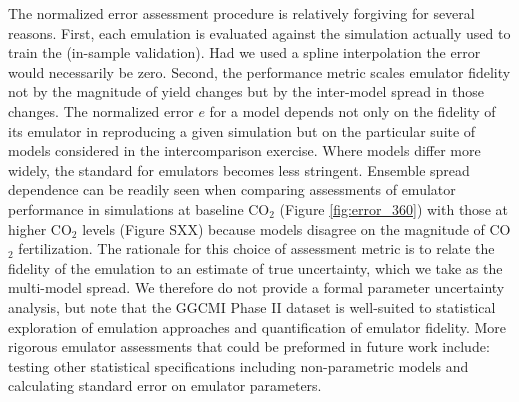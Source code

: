 \documentclass[gmd, manuscript]{copernicus} %
\begin{document}
The normalized error assessment procedure is relatively forgiving for several reasons. 
First, each emulation is evaluated against the simulation actually used to train the  (in-sample validation). 
Had we used a spline interpolation the error would necessarily be zero. 
Second, the performance metric scales emulator fidelity not by the magnitude of yield changes but by the inter-model spread in those changes. 
The normalized error $e$ for a model depends not only on the fidelity of its emulator in reproducing a given simulation but on the particular suite of models considered in the intercomparison exercise. 
Where models differ more widely, the standard for emulators becomes less stringent. 
Ensemble spread dependence can be readily seen when comparing assessments of emulator performance in simulations at baseline CO$_2$ (Figure \ref{fig:error_360}) with those at higher CO$_2$ levels (Figure SXX) because models disagree on the magnitude of CO$_2$ fertilization. 
The rationale for this choice of assessment metric is to relate the fidelity of the emulation to an estimate of true uncertainty, which we take as the multi-model spread. 
We therefore do not provide a formal parameter uncertainty analysis, but note that the GGCMI Phase II dataset is well-suited to statistical exploration of emulation approaches and quantification of emulator fidelity. 
More rigorous emulator assessments that could be preformed in future work include: testing other statistical specifications including non-parametric models and calculating standard error on emulator parameters.
\end{document}
